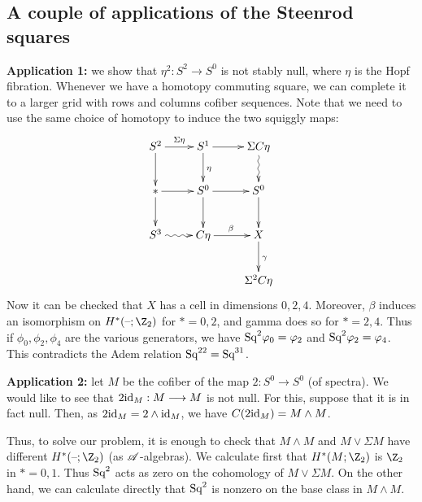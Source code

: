 \documentclass[11pt]{article}
\newcommand{\myheading}[1]
{{\noindent\Large #1}

}
\renewcommand{\myheading}[1]{\subsection{#1}}
\begin{document}
\begin{applications of steenrod squares}
\myheading{A couple of applications of the Steenrod squares}
\textbf{Application 1:} we show that $\eta^2:S^2\to S^0$ is not stably null,
where $\eta$ is the Hopf fibration. Whenever we have a homotopy commuting
square, we can complete it to a larger grid with rows and columns cofiber
sequences. Note that we need to use the same choice of homotopy to induce the
two squiggly maps:
\[\xymatrix{
S^2\ar[r]^{\Sigma\eta}\ar[d]&S^1\ar[r] \ar[d]^\eta&\Sigma C\eta\ar@{~>}[d]\\
\text{$*$}\ar[r]\ar[d]& S^0\ar[r]\ar[d]&S^0\ar[d]\\
S^3\ar@{~>}[r]&C\eta\ar[r]^\beta&X\ar[d]^\gamma\\
&&\Sigma^2C\eta
}\]
Now it can be checked that $X$ has a cell in dimensions $0,2,4$. Moreover,
$\beta$ induces an isomorphism on $H^*(\DASH;\Z_2)$ for $*=0,2$, and gamma does
so for $*=2,4$. Thus if $\phi_0,\phi_2,\phi_4$ are the various generators, we
have $\textup{Sq}^2\varphi_0=\varphi_2$ and $\textup{Sq}^2\varphi_2=\varphi_4$. This contradicts the Adem
relation $\textup{Sq}^{22}=\textup{Sq}^{31}$.

\textbf{Application 2:}  let $M$ be the cofiber of the map $2:S^0\to S^0$ (of
spectra). We would like to see that $2\textup{id}_M:M\longrightarrow M$ is not null. For this,
suppose that it is in fact null. Then, as $2\textup{id}_M=2\wedge\textup{id}_M$, we have
$C(2\textup{id}_M)=M\wedge M$.

Thus, to solve our problem, it is enough to check that $M\wedge M$ and $M\vee
\Sigma M$ have different $H^*(\DASH;\Z_2)$ (as $\mathscr{A}$-algebras). We calculate
first that $H^*(M;\Z_2)$ is $\Z_2$ in $*=0,1$. Thus $\textup{Sq}^2$ acts as zero on the
cohomology of $M\vee \Sigma M$. On the other hand, we can calculate directly
that $\textup{Sq}^2$ is nonzero on the base class in $M\wedge M$.


\end{applications of steenrod squares}
\end{document}
